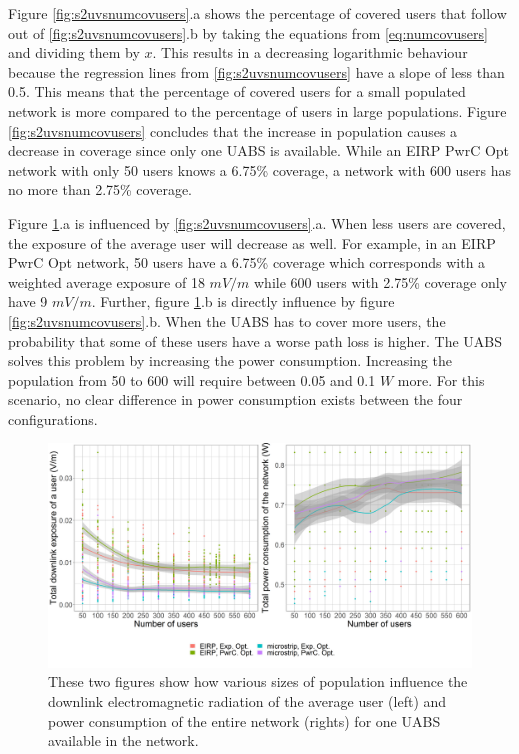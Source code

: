 Figure \ref{fig:s2uvsnumcovusers}.a shows the percentage of covered users that follow out of \ref{fig:s2uvsnumcovusers}.b by taking the equations 
from \ref{eq:numcovusers} and dividing them by $x$.
This results in a decreasing logarithmic behaviour because the regression lines from  \ref{fig:s2uvsnumcovusers} have a slope of less than 0.5.
This means that the percentage of covered users for a small populated network is more compared to the percentage of users in large populations.
Figure \ref{fig:s2uvsnumcovusers} concludes that the increase in population causes a decrease in coverage since only 
one \gls{UABS} is available. While an \gls{EIRP} \gls{PwrC Opt} network with only 50 users knows  a 6.75\% coverage, a network with 600 users has no more than 2.75\% coverage.

\clearpage
Figure  \ref{fig:s2b_dlAndPc}.a  is influenced by  \ref{fig:s2uvsnumcovusers}.a. When less users are 
covered, the exposure of the average user will decrease as well.
For example, in an EIRP \gls{PwrC Opt} network, 50 users have a 6.75\% coverage which corresponds with a weighted average exposure of  18 $mV/m$
while 600 users with 2.75\% coverage only have 9 $mV/m$.
Further,  figure \ref{fig:s2b_dlAndPc}.b is directly influence by figure \ref{fig:s2uvsnumcovusers}.b. When the \gls{UABS} has to cover more users,
the probability that some of these users have a worse path loss is higher. The \gls{UABS} solves this problem by increasing the 
power consumption. Increasing the population from 50 to 600 will require between 0.05 and 0.1 $W$ more. 
For this scenario, no clear difference in power consumption exists between the four configurations.

\begin{figure}[h!]
  \includegraphics[width=\textwidth]{../results/s2/uvsdlAndPc.png}
  \caption{These two figures show how various sizes of population influence the downlink electromagnetic radiation of the average user (left) and 
  power consumption of the entire network (rights) for one \acs{UABS} available in the network.}
  \label{fig:s2b_dlAndPc}
\end{figure}

